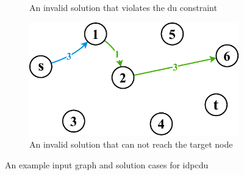 \begin{figure}[htbp]
\begin{subfigure}{.49\linewidth}
		\caption{An invalid solution that violates the \gls{du} constraint}
		\label{fig:invalid_path_b}
	\end{subfigure}
	\begin{subfigure}{.49\linewidth}
		\centering
		\includegraphics[scale=\scalefigure]{Figures/chap 2/Invalid Solution 2.pdf}
		\caption{An invalid solution that can not reach
			the target node}
		\label{fig:invalid_path_c}
	\end{subfigure}	
	\caption{An example input graph and solution cases for \gls{idpcdu}}
	\label{fig:solution_cases}
\end{figure}